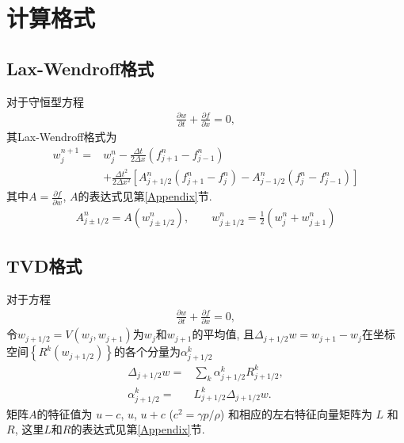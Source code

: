 \documentclass[10.5pt
]{article}
\begin{document}
\section{计算格式}
\subsection{Lax-Wendroff格式}
对于守恒型方程
\begin{align}
\frac{\partial w}{\partial t} + \frac{\partial f}{\partial x} = 0,
\end{align}
其Lax-Wendroff格式为
\begin{align}
w_j^{n+1} =& w_j^n - \frac{\Delta t}{2\Delta x} (f_{j+1}^n - f_{j-1}^n) \nonumber\\
& + \frac{\Delta t^2}{2\Delta x^2} \left[A_{j+1/2}^n (f_{j+1}^n-f_j^n) - A_{j-1/2}^n (f_j^n -
f_{j-1}^n)\right]
\end{align}
其中$A = \frac{\partial f}{\partial w}$, $A$的表达式见第\ref{Appendix}节.
\begin{align}
A_{j \pm 1/2}^n = A(w_{j \pm 1/2}^n), \qquad w_{j \pm 1/2}^n = \frac{1}{2} (w_j^n + w_{j \pm 1}^n)
\end{align}

\subsection{TVD格式}
对于方程
\begin{align}\label{tvd}
\frac{\partial w}{\partial t}+\frac{\partial f}{\partial x}=0,
\end{align}
令$w_{j+1/2} = V(w_j, w_{j+1})$为$w_j$和$w_{j+1}$的平均值, 
且$\Delta_{j+1/2}w = w_{j+1} - w_j$在坐标空间$\left\{R^k \left(w_{j+1/2}\right)\right\}$的各个分量为$\alpha^{k} _{j+1/2}$
\begin{align}
\Delta_{j+1/2}w =& \sum_k \alpha^{k}_{j+1/2} R^{k}_{j+1/2},\\
\alpha^{k}_{j+1/2} =& L^{k}_{j+1/2} \Delta_{j+1/2}w.
\end{align}
矩阵$A$的特征值为 $u-c$, $u$, $u+c$ ($c^2 = \gamma p/\rho$) 和相应的左右特征向量矩阵为 $L$ 和 $R$, 这里$L$和$R$的表达式见第\ref{Appendix}节.
\end{document}
